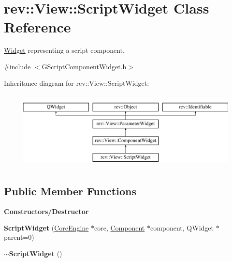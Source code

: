 \hypertarget{classrev_1_1_view_1_1_script_widget}{}\section{rev\+::View\+::Script\+Widget Class Reference}
\label{classrev_1_1_view_1_1_script_widget}


\mbox{\hyperlink{class_widget}{Widget}} representing a script component.  




{\ttfamily \#include $<$G\+Script\+Component\+Widget.\+h$>$}

Inheritance diagram for rev\+::View\+::Script\+Widget\+:\begin{figure}[H]
\begin{center}
\leavevmode
\includegraphics[height=4.000000cm]{classrev_1_1_view_1_1_script_widget}
\end{center}
\end{figure}
\subsection*{Public Member Functions}
\begin{Indent}\textbf{ Constructors/\+Destructor}\par
\begin{DoxyCompactItemize}
\item 
\mbox{\label{classrev_1_1_view_1_1_script_widget_a779507287b1da106e6507cafc41406ef}} 
{\bfseries Script\+Widget} (\mbox{\hyperlink{classrev_1_1_core_engine}{Core\+Engine}} $\ast$core, \mbox{\hyperlink{classrev_1_1_component}{Component}} $\ast$component, Q\+Widget $\ast$parent=0)
\item 
\mbox{\label{classrev_1_1_view_1_1_script_widget_a3fd43bdcceb5be6b505ea4d5413369fb}} 
{\bfseries $\sim$\+Script\+Widget} ()
\end{DoxyCompactItemize}
\end{Indent}
